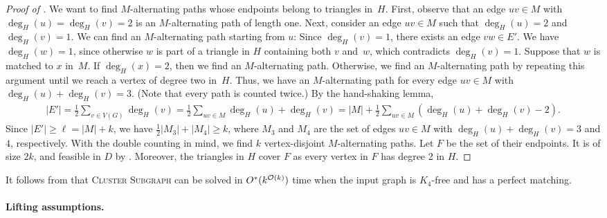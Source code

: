 \begin{proof}[Proof of ]
  We want to find $M$-alternating paths whose endpoints belong to triangles in~$H$.
  First, observe that an edge $uv \in M$ with $\deg_H(u) = \deg_H(v) = 2$ is an $M$-alternating path of length one.
  Next, consider an edge $uv \in M$ such that $\deg_H(u) = 2$ and $\deg_H(v) {= 1}$. We can find an $M$-alternating path starting from $u$:
  Since $\deg_H(v) = 1$, there exists an edge $vw \in E'$.
  We have $\deg_H(w) = 1$, since otherwise $w$ is part of a triangle in $H$ containing both $v$ and~$w$, which contradicts $\deg_H(v) = 1$.
  Suppose that $w$ is matched to $x$ in~$M$.
  If $\deg_H(x) = 2$, then we find an $M$-alternating path.
  Otherwise, we find an $M$-alternating path by repeating this argument until we reach a vertex of degree two in~$H$.
  Thus, we have an $M$-alternating path for every edge $uv \in M$ with $\deg_H(u) + \deg_H(v) = 3$.
  (Note that every path is counted twice.)
  By the hand-shaking lemma,  
  \begin{align*}
  |E'| = \frac{1}{2} \sum_{v \in V(G)} \deg_H(v) = \frac{1}{2} \sum_{uv \in M} \deg_H(u) + \deg_H(v) = |M| + \frac{1}{2} \sum_{uv \in M} (\deg_H(u) + \deg_H(v) - 2).
  \end{align*}
  Since $|E'| \ge \ell = |M| + k$, we have $\frac{1}{2}|M_3| + |M_4| \ge k$, where $M_3$ and $M_4$ are the set of edges $uv \in M$ with $\deg_H(u) + \deg_H(v) = 3$ and $4$, respectively.
  With the double counting in mind, we find $k$ vertex-disjoint $M$-alternating paths.
  Let $F$ be the set of their endpoints.
  It is of size $2k$, and feasible in $D$ by .
  Moreover, the triangles in $H$ cover $F$ as every vertex in $F$ has degree 2 in $H$.
\end{proof}

It follows from  that \textsc{Cluster Subgraph} can be solved in $O^*(k^{\mathcal{O}(k)})$ time when the input graph is $K_4$-free and has a perfect matching.

\paragraph*{Lifting assumptions.}


